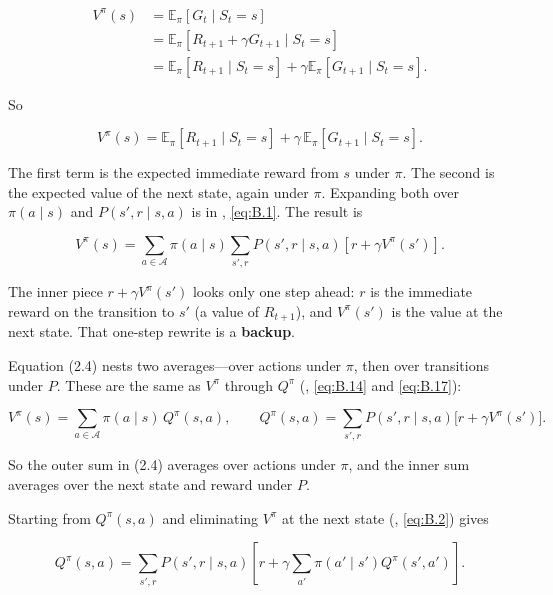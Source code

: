 \[
\begin{aligned}
V^\pi(s)
&= \mathbb{E}_\pi [G_t \mid S_t = s] \\
&= \mathbb{E}_\pi [R_{t+1} + \gamma G_{t+1} \mid S_t = s] \\
&= \mathbb{E}_\pi [R_{t+1} \mid S_t = s] + \gamma \mathbb{E}_\pi [G_{t+1} \mid S_t = s].
\end{aligned}
\]

So

\begin{equation}
V^\pi(s)
=
\mathbb{E}_\pi [R_{t+1} \mid S_t = s]
+
\gamma\, \mathbb{E}_\pi [G_{t+1} \mid S_t = s].
\tag{2.3}
\end{equation}

The first term is the expected immediate reward from $s$ under $\pi$. The second is the expected value of the next state, again under $\pi$. Expanding both over $\pi(a\mid s)$ and $P(s',r\mid s,a)$ is in , \eqref{eq:B.1}. The result is

\begin{equation}
V^\pi(s) = \sum_{a \in \mathcal{A}} \pi(a \mid s) \sum_{s', r} P(s',r \mid s,a) \left[ r + \gamma V^\pi(s') \right].
\tag{2.4}
\end{equation}

The inner piece $r+\gamma V^\pi(s')$ looks only one step ahead: $r$ is the immediate reward on the transition to $s'$ (a value of $R_{t+1}$), and $V^\pi(s')$ is the value at the next state. That one-step rewrite is a \textbf{backup}.

Equation (2.4) nests two averages---over actions under $\pi$, then over transitions under $P$. These are the same as $V^\pi$ through $Q^\pi$ (, \eqref{eq:B.14} and \eqref{eq:B.17}):

\[
V^\pi(s)
=
\sum_{a \in \mathcal{A}}
\pi(a \mid s)\, Q^\pi(s,a),
\qquad
Q^\pi(s,a)
=
\sum_{s',r}
P(s',r \mid s,a)
\bigl[
r + \gamma V^\pi(s')
\bigr].
\]

So the outer sum in (2.4) averages over actions under $\pi$, and the inner sum averages over the next state and reward under $P$.

Starting from $Q^\pi(s,a)$ and eliminating $V^\pi$ at the next state (, \eqref{eq:B.2}) gives

\begin{equation}
Q^\pi(s,a) = \sum_{s',r} P(s',r \mid s,a) \left[ r + \gamma \sum_{a'} \pi(a' \mid s') Q^\pi(s',a') \right].
\tag{2.5}
\end{equation}

